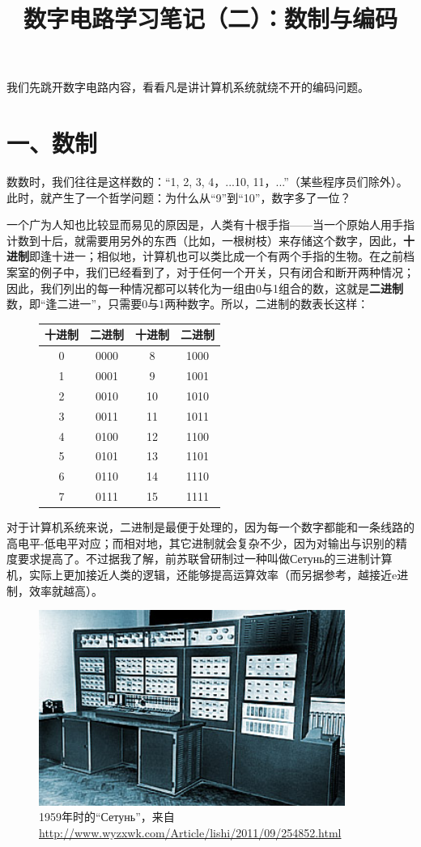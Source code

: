 \documentclass[UTF8]{ctexart}
\title{数字电路学习笔记（二）：数制与编码}
\begin{document}
\maketitle
我们先跳开数字电路内容，看看凡是讲计算机系统就绕不开的编码问题。

\section*{一、数制}
数数时，我们往往是这样数的：“1, 2, 3, 4，...10, 11，...”（某些程序员们除外）。此时，就产生了一个哲学问题：为什么从“9”到“10”，数字多了一位？

一个广为人知也比较显而易见的原因是，人类有十根手指——当一个原始人用手指计数到十后，就需要用另外的东西（比如，一根树枝）来存储这个数字，因此，\textbf{十进制}即逢十进一；相似地，计算机也可以类比成一个有两个手指的生物。在之前档案室的例子中，我们已经看到了，对于任何一个开关，只有闭合和断开两种情况；因此，我们列出的每一种情况都可以转化为一组由0与1组合的数，这就是\textbf{二进制}数，即“逢二进一”，只需要0与1两种数字。所以，二进制的数表长这样：
\begin{figure}
    \begin{tabular}{|c|c|c|c|}\hline\rowcolor{lightgray}
        十进制 & 二进制 & 十进制 & 二进制\\\hline
        0&0000&8&1000\\\hline
        1&0001&9&1001\\\hline
        2&0010&10&1010\\\hline
        3&0011&11&1011\\\hline
        4&0100&12&1100\\\hline
        5&0101&13&1101\\\hline
        6&0110&14&1110\\\hline
        7&0111&15&1111\\\hline
    \end{tabular}
\end{figure}

对于计算机系统来说，二进制是最便于处理的，因为每一个数字都能和一条线路的高电平-低电平对应；而相对地，其它进制就会复杂不少，因为对输出与识别的精度要求提高了。不过据我了解，前苏联曾研制过一种叫做Сетунь的三进制计算机\cite{1}，实际上更加接近人类的逻辑，还能够提高运算效率（而另据参考，越接近e进制，效率就越高\cite{2}）。

\begin{figure}
\includegraphics[width=10cm]{Fig1.jpg}
\caption*{1959年时的“Сетунь”，来自\url{http://www.wyzxwk.com/Article/lishi/2011/09/254852.html}}
\end{figure}
\end{document}
